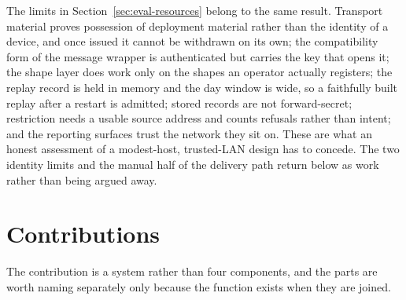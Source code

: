 \documentclass[12pt,a4paper]{report}
\begin{document}
The limits in Section~\ref{sec:eval-resources} belong to the
same result. Transport material proves possession of
deployment material rather than the identity of a device,
and once issued it cannot be withdrawn on its own; the
compatibility form of the message wrapper is authenticated
but carries the key that opens it; the shape layer does work
only on the shapes an operator actually registers; the
replay record is held in memory and the day window is wide,
so a faithfully built replay after a restart is admitted;
stored records are not forward-secret; restriction needs a
usable source address and counts refusals rather than intent;
and the reporting surfaces trust the network they sit on.
These are what an honest assessment of a modest-host,
trusted-LAN design has to concede. The two identity limits
and the manual half of the delivery path return below as
work rather than being argued away.

\section{Contributions}

The contribution is a system rather than four components,
and the parts are worth naming separately only because the
function exists when they are joined.
\end{document}
